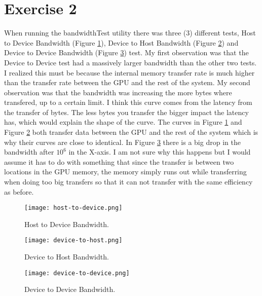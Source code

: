 \documentclass[a4paper, 12pt]{article}
\begin{document}
\section{Exercise 2}
When running the bandwidthTest utility there was three (3) different tests, Host to Device Bandwidth (Figure \ref{fig:htd}), Device to Host Bandwidth (Figure \ref{fig:dth}) and Device to Device Bandwidth (Figure \ref{fig:dtd}) test.
My first observation was that the Device to Device test had a massively larger bandwidth than the other two tests. I realized this must be because the internal memory transfer rate is much higher than the transfer rate between the GPU and the rest of the system. My second observation was that the bandwidth was increasing the more bytes where transfered, up to a certain limit. I think this curve comes from the latency from the transfer of bytes. The less bytes you transfer the bigger impact the latency has, which would explain the shape of the curve. The curves in Figure \ref{fig:htd} and Figure \ref{fig:dth} both transfer data between the GPU and the rest of the system which is why their curves are close to identical. In Figure \ref{fig:dtd} there is a big drop in the bandwidth after $10^6$ in the X-axis. I am not sure why this happens but I would assume it has to do with something that since the transfer is between two locations in the GPU memory, the memory simply runs out while transferring when doing too big transfers so that it can not transfer with the same efficiency as before.
\begin{figure}
	\centering
	\texttt{[image: host-to-device.png]}
	\caption{Host to Device Bandwidth.}
	\label{fig:htd}
\end{figure}
\begin{figure}
	\centering
	\texttt{[image: device-to-host.png]}
	\caption{Device to Host Bandwidth.}
	\label{fig:dth}
\end{figure}
\begin{figure}
	\centering
	\texttt{[image: device-to-device.png]}
	\caption{Device to Device Bandwidth.}
	\label{fig:dtd}
\end{figure}
\end{document}
